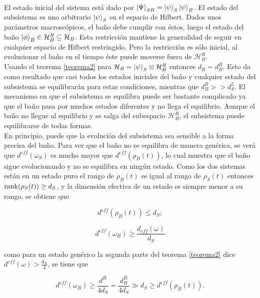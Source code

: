 \\
El estado inicial del sistema está dado por $\ket{\Psi}_{SB}=\ket{\psi}_{S} \ket{\psi}_{B}$. El estado del subsistema es uno arbitrario $\ket{\psi}_{S}$ en el espacio de Hilbert. Dados unos parámetros macroscópicos, el baño  debe cumplir con éstos, luego el estado del baño $\ket{\phi}_{B} \in \mathcal{H}_{B}^{R} \subseteq \mathcal{H}_{B}$. Esta restricción mantiene la generalidad de seguir en cualquier espacio de Hilbert restringido. Pero la restricción es sólo inicial, al evolucionar el baño en el tiempo éste puede moverse fuera de $\mathcal{H}_{B}^{R}$.
\\
Usando el teorema \ref{teorema2} para $\mathcal{H}_{R}= \ket{\psi}_{S} \otimes \mathcal{H}_{B}^{R}$ entonces $d_{R}=d_{B}^{R}$. Esto da como resultado que casi todos los estados iniciales del baño y cualquier estado del subsistema se equilibrarán para estas condiciones, mientras que $d_{B}^{R} >> d_{S}^{2}$. El mecanismo en que el subsistema se equilibra puede ser bastante complicado ya que el baño pasa por muchos estados diferentes y no llega el equilibrio. Aunque el baño no llegue al equilibrio y se salga del subespacio $\mathcal{H}_{B}^{R}$, el subsistema puede equilibrarse de todas formas. 
\\
En principio, puede que la evolución del subsistema sea sensible a la forma precisa del baño. Para ver que el baño no se equilibra de manera genérica, se verá que $d^{eff}(\omega_{S})$ es mucho mayor que $d^{eff}(\rho_{B}(t))$, lo cual muestra que el baño sigue evolucionando y no se equilibra en ningún estado. Como los dos sistemas están en un estado puro el rango de $\rho_{B}(t)$ es igual al rango de $\rho_{S}(t)$ entonces  $\rank(\rho_{S}(t)) \geq d_{S}$, y la dimensión efectiva de un estado es siempre menor a su rango, se obtiene que

\begin{equation}
d^{eff}(\rho_{B}(t)) \leq d_{S};
\end{equation}

\begin{equation}
d^{eff}(\omega_{B}) \geq \frac{d_{eff}(\omega)}{d_{S}}
\end{equation}

como para un estado genérico la segunda parte del teorema \ref{teorema2}  dice $d^{eff}(\omega) > \frac{d_{R}}{4}$, se tiene que

\begin{equation}
d^{eff}(\omega_{B}) \geq \frac{d^{R}}{4d_{S}}=\frac{d_{B}^{R}}{4d_{S}} \gg d_{S} \geq d^{eff}(\rho_{B}(t)).
\end{equation}


